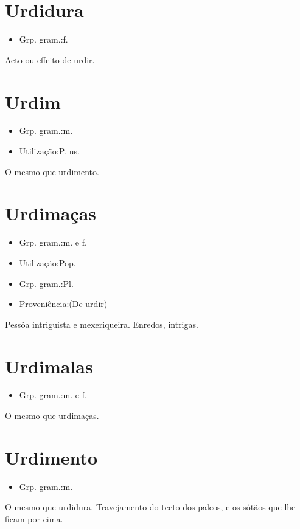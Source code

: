 \documentclass{article}
\begin{document}
\section{Urdidura}
\begin{itemize}
\item {Grp. gram.:f.}
\end{itemize}
Acto ou effeito de urdir.
\section{Urdim}
\begin{itemize}
\item {Grp. gram.:m.}
\end{itemize}
\begin{itemize}
\item {Utilização:P. us.}
\end{itemize}
O mesmo que \textunderscore urdimento\textunderscore .
\section{Urdimaças}
\begin{itemize}
\item {Grp. gram.:m.  e  f.}
\end{itemize}
\begin{itemize}
\item {Utilização:Pop.}
\end{itemize}
\begin{itemize}
\item {Grp. gram.:Pl.}
\end{itemize}
\begin{itemize}
\item {Proveniência:(De \textunderscore urdir\textunderscore )}
\end{itemize}
Pessôa intriguista e mexeriqueira.
Enredos, intrigas.
\section{Urdimalas}
\begin{itemize}
\item {Grp. gram.:m.  e  f.}
\end{itemize}
O mesmo que \textunderscore urdimaças\textunderscore .
\section{Urdimento}
\begin{itemize}
\item {Grp. gram.:m.}
\end{itemize}
O mesmo que \textunderscore urdidura\textunderscore .
Travejamento do tecto dos palcos, e os sótãos que lhe ficam por cima.
\end{document}

